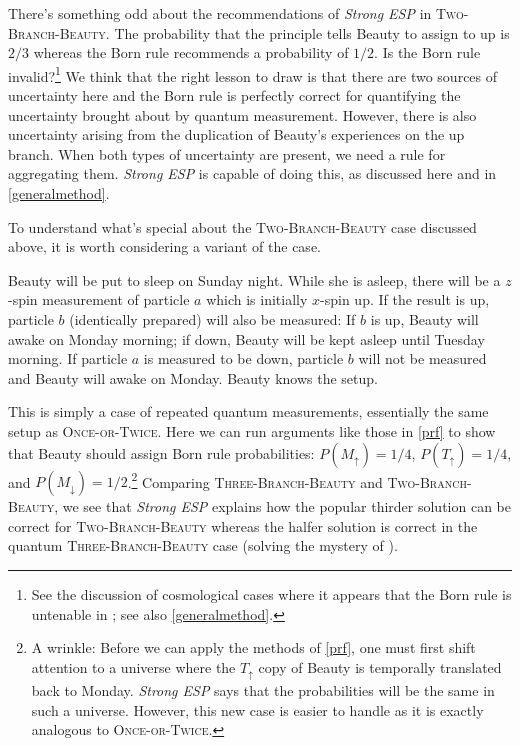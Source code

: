 \documentclass[12pt,onecolumn,secnumarabic,amsmath,amssymb,balancelastpage,nofootinbib]{article}
\begin{document}
There's something odd about the recommendations of \emph{Strong ESP} in \textsc{Two-Branch-Beauty}.  The probability that the principle tells Beauty to assign to up is $2/3$ whereas the Born rule recommends a probability of $1/2$.  Is the Born rule invalid?\footnote{See the discussion of cosmological cases where it appears that the Born rule is untenable in \citep{Page:2009qe}; see also \textsection \ref{generalmethod}.}  We think that the right lesson to draw is that there are two sources of uncertainty here and the Born rule is perfectly correct for quantifying the uncertainty brought about by quantum measurement.  However, there is also uncertainty arising from the duplication of Beauty's experiences on the up branch.  When both types of uncertainty are present, we need a rule for aggregating them.  \emph{Strong ESP} is capable of doing this, as discussed here and in \textsection \ref{generalmethod}.

To understand what's special about the \textsc{Two-Branch-Beauty} case discussed above, it is worth considering a variant of the case.
\begin{description}[font=\normalfont\scshape]
\item[Three-Branch-Beauty] Beauty will be put to sleep on Sunday night.  While she is asleep, there will be a $z$-spin measurement of particle $a$ which is initially $x$-spin up.  If the result is up, particle $b$ (identically prepared) will also be measured: If $b$ is up, Beauty will awake on Monday morning; if down, Beauty will be kept asleep until Tuesday morning.  If particle $a$ is measured to be down, particle $b$ will not be measured and Beauty will awake on Monday.  Beauty knows the setup.
\end{description}
This is simply a case of repeated quantum measurements, essentially the same setup as \textsc{Once-or-Twice}.  Here we can run arguments like those in \textsection \ref{prf} to show that Beauty should assign Born rule probabilities: $P\left(M_\uparrow\right)=1/4$, $P\left(T_\uparrow\right)=1/4$, and $P\left(M_\downarrow\right)=1/2$.\footnote{A wrinkle:  Before we can apply the methods of \textsection \ref{prf}, one must first shift attention to a universe where the $T_\uparrow$ copy of Beauty is temporally translated back to Monday.  \emph{Strong ESP} says that the probabilities will be the same in such a universe.  However, this new case is easier to handle as it is exactly analogous to \textsc{Once-or-Twice}.}  Comparing \textsc{Three-Branch-Beauty} and \textsc{Two-Branch-Beauty}, we see that \emph{Strong ESP} explains how the popular thirder solution can be correct for \textsc{Two-Branch-Beauty} whereas the halfer solution is correct in the quantum \textsc{Three-Branch-Beauty} case (solving the mystery of \citealp{plewis}).
\end{document}
